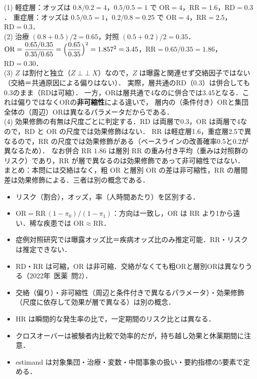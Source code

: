 \documentclass[a4paper,11pt,openany]{ltjsbook}
\newenvironment{kaitou}[1]{%
  \par\medskip\noindent
  \begin{tcolorbox}[enhanced,breakable,colback=bkgray!3,colframe=bkgray!60,boxrule=0.4pt,
    left=4pt,right=4pt,top=2pt,bottom=2pt,arc=1pt,
    title={\cref{#1}の解答},fonttitle=\bfseries\small,coltitle=white,colbacktitle=bkgray!80]}%
  {\end{tcolorbox}\par}
\newcommand{\kakomon}[2]{\mbox{#1年 医薬 問#2}}
\newcommand{\RR}{\mathrm{RR}}
\newcommand{\RD}{\mathrm{RD}}
\newcommand{\OR}{\mathrm{OR}}
\newcommand{\indep}{\mathop{\perp\!\!\!\perp}}
\begin{document}
\begin{kaitou}{reidai:02-3}
(1) 軽症層：オッズは $0.8/0.2=4$，$0.5/0.5=1$ で $\OR=4$，$\RR=1.6$，$\RD=0.3$．
重症層：オッズは $0.5/0.5=1$，$0.2/0.8=0.25$ で $\OR=4$，$\RR=2.5$，$\RD=0.3$．\\
(2) 治療 $(0.8+0.5)/2=0.65$，対照 $(0.5+0.2)/2=0.35$．
$\OR=\dfrac{0.65/0.35}{0.35/0.65}=\Bigl(\dfrac{0.65}{0.35}\Bigr)^2=1.857^2=3.45$，$\RR=0.65/0.35=1.86$，$\RD=0.30$．\\
(3) $Z$ は割付と独立（$Z\indep X$）なので，$Z$ は曝露と関連せず交絡因子ではない（交絡＝共通原因による偏りはない）．
実際，層共通のRD（0.3）は併合しても0.3のまま（RDは可縮）．
一方，ORは層共通で4なのに併合では3.45となる．これは偏りではなくORの\textbf{非可縮性}による違いで，
層内の（条件付き）ORと集団全体の（周辺）ORは異なるパラメータだからである．\\
(4) 効果修飾の有無は尺度ごとに判定する．RD は両層で0.3，OR は両層で4なので，RD と OR の尺度では効果修飾はない．
RR は軽症層1.6，重症層2.5で異なるので，RR の尺度では効果修飾がある（ベースラインの改善確率0.5と0.2が異なるため）．
なお併合 RR $1.86$ は層別 RR の重み付き平均（重みは対照群のリスク）であり，RR が層で異なるのは効果修飾であって非可縮性ではない．\\
まとめ：本問には交絡はなく，粗 OR と層別 OR の差は非可縮性，RR の層間差は効果修飾による．三者は別の概念である．
\end{kaitou}

\begin{summarybox}
\begin{itemize}
\item リスク（割合），オッズ，率（人時間あたり）を区別する．
\item $\OR=\RR\,(1-\pi_0)/(1-\pi_1)$：方向は一致し，OR は RR より1から遠い．稀な疾患では $\OR\approx\RR$．
\item 症例対照研究では曝露オッズ比＝疾病オッズ比のみ推定可能．RR・リスクは推定できない．
\item RD・RR は可縮，OR は非可縮．交絡がなくても粗ORと層別ORは異なりうる（\kakomon{2022}{2}）．
\item 交絡（偏り）・非可縮性（周辺と条件付きで異なるパラメータ）・効果修飾（尺度に依存して効果が層で異なる）は別の概念．
\item HR は瞬間的な発生率の比で，一定期間のリスク比とは異なる．
\item クロスオーバーは被験者内比較で効率的だが，持ち越し効果と休薬期間に注意．
\item estimand は対象集団・治療・変数・中間事象の扱い・要約指標の5要素で定める．
\end{itemize}
\end{summarybox}
\end{document}
